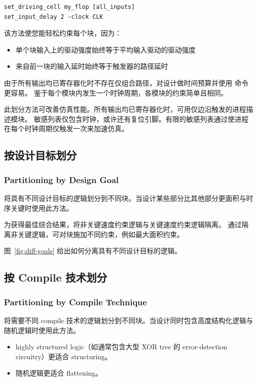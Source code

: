\begin{lstlisting}
set_driving_cell my_flop [all_inputs]
set_input_delay 2 -clock CLK
\end{lstlisting}

该方法使您能轻松约束每个块，因为：
\begin{itemize}
  \item 单个块输入上的驱动强度始终等于平均输入驱动的驱动强度
  \item 来自前一块的输入延时始终等于触发器的路径延时
\end{itemize}

由于所有输出均已寄存器化时不存在仅组合路径，对设计做时间预算并使用  命令更容易。
鉴于每个模块内发生一个时钟周期，各模块的约束简单且相同。

此划分方法可改善仿真性能。所有输出均已寄存器化时，可用仅边沿触发的进程描述模块。
敏感列表仅包含时钟，或许还有复位引脚。有限的敏感列表通过使进程在每个时钟周期仅触发一次来加速仿真。

\subsection{按设计目标划分}
\subsubsection*{Partitioning by Design Goal}

将具有不同设计目标的逻辑划分到不同块。当设计某些部分比其他部分更面积与时序关键时使用此方法。

为获得最佳综合结果，将非关键速度约束逻辑与关键速度约束逻辑隔离。
通过隔离非关键逻辑，可对块施加不同约束，例如最大面积约束。

图~\ref{fig:diff-goals} 给出如何分离具有不同设计目标的逻辑。


\subsection{按 Compile 技术划分}
\subsubsection*{Partitioning by Compile Technique}

将需要不同 compile 技术的逻辑划分到不同块。当设计同时包含高度结构化逻辑与随机逻辑时使用此方法。
\begin{itemize}
  \item highly structured logic（如通常包含大型 XOR tree 的 error-detection circuitry）更适合 structuring。
  \item 随机逻辑更适合 flattening。
\end{itemize}

